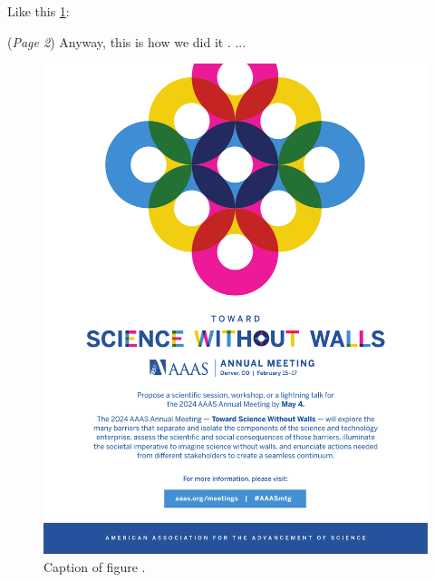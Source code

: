 \begin{revresponse}
	Like this \ref{fig}:

	\begin{changes}
		(\emph{Page 2}) Anyway, this is how we did it \cite{2013Management, Uehata1997Calcium}. ... 

		\begin{figure}[H]
			\centering
			\includegraphics[scale=0.4]{figures/productads.pdf}
			\caption{Caption of figure \cite{2013Management}.}
			\label{fig}
		\end{figure}
	\end{changes}



\end{revresponse}


